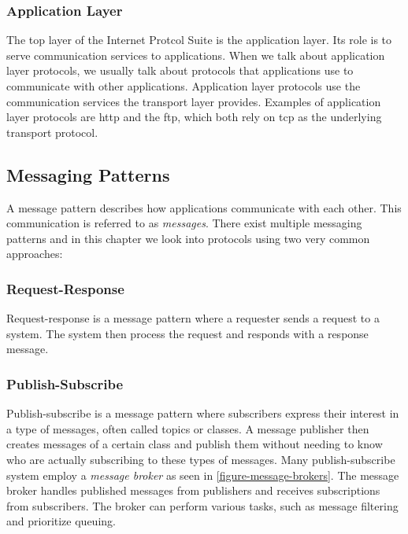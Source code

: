 \subsubsection{Application Layer}

The top layer of the Internet Protcol Suite is the application layer. Its role
is to serve communication services to applications. When we talk about
application layer protocols, we usually talk about protocols that applications
use to communicate with other applications. Application layer protocols use the
communication services the transport layer provides. Examples of application
layer protocols are \gls{http} and the \gls{ftp}, which both rely on \gls{tcp}
as the underlying transport protocol.

\subsection{Messaging Patterns}

A message pattern describes how applications communicate with each other. This
communication is referred to as \textit{messages}. There exist multiple
messaging patterns and in this chapter we look into protocols using two very
common approaches:

\subsubsection{Request-Response}

Request-response is a message pattern where a requester sends a request to a
system. The system then process the request and responds with a response
message.

\subsubsection{Publish-Subscribe}

Publish-subscribe is a message pattern where subscribers express their interest
in a type of messages, often called topics or classes. A message publisher then
creates messages of a certain class and publish them without needing to know who
are actually subscribing to these types of messages. Many publish-subscribe
system employ a \textit{message broker} as seen in
\cref{figure-message-brokers}. The message broker handles published messages
from publishers and receives subscriptions from subscribers. The broker can
perform various tasks, such as message filtering and prioritize queuing.

